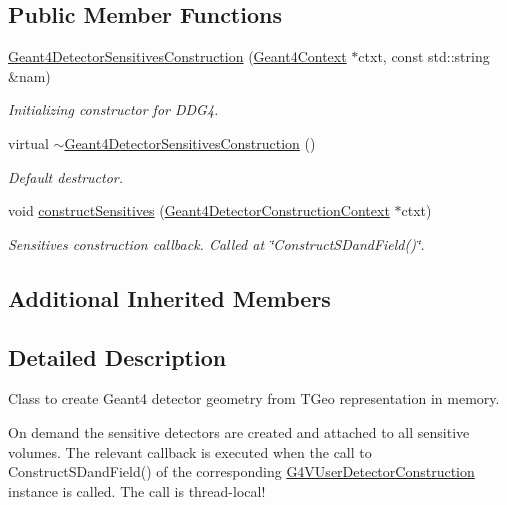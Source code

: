 \subsection*{Public Member Functions}
\begin{DoxyCompactItemize}
\item 
\hyperlink{class_d_d4hep_1_1_simulation_1_1_geant4_detector_sensitives_construction_a7ddfbbc0ba06d771e339d6a706835894}{Geant4\+Detector\+Sensitives\+Construction} (\hyperlink{class_d_d4hep_1_1_simulation_1_1_geant4_context}{Geant4\+Context} $\ast$ctxt, const std\+::string \&nam)
\begin{DoxyCompactList}\small\item\em Initializing constructor for D\+D\+G4. \end{DoxyCompactList}\item 
virtual \hyperlink{class_d_d4hep_1_1_simulation_1_1_geant4_detector_sensitives_construction_a3013821bbc1d900a35f0a4e26a1956b6}{$\sim$\+Geant4\+Detector\+Sensitives\+Construction} ()
\begin{DoxyCompactList}\small\item\em Default destructor. \end{DoxyCompactList}\item 
void \hyperlink{class_d_d4hep_1_1_simulation_1_1_geant4_detector_sensitives_construction_ae698013abe689d2e76e1423d5e08f246}{construct\+Sensitives} (\hyperlink{class_d_d4hep_1_1_simulation_1_1_geant4_detector_construction_context}{Geant4\+Detector\+Construction\+Context} $\ast$ctxt)
\begin{DoxyCompactList}\small\item\em Sensitives construction callback. Called at \char`\"{}\+Construct\+S\+Dand\+Field()\char`\"{}. \end{DoxyCompactList}\end{DoxyCompactItemize}
\subsection*{Additional Inherited Members}


\subsection{Detailed Description}
Class to create Geant4 detector geometry from T\+Geo representation in memory. 

On demand the sensitive detectors are created and attached to all sensitive volumes. The relevant callback is executed when the call to Construct\+S\+Dand\+Field() of the corresponding \hyperlink{class_g4_v_user_detector_construction}{G4\+V\+User\+Detector\+Construction} instance is called. The call is thread-\/local!

